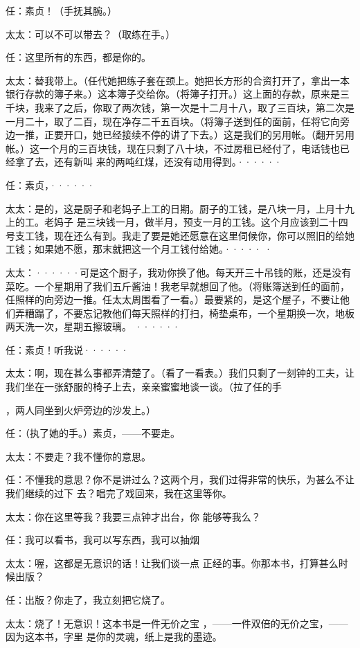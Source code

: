 \documentclass{article}
\begin{document}
\newpage

任：素贞！（手抚其腕。） 


太太：可以不可以带去？（取练在手。） 


任：这里所有的东西，都是你的。 

太太：替我带上。（任代她把练子套在颈上。她把长方形的合资打开了，拿出一本银行存款的簿子来。）这本簿子交给你。（将簿子打开。）这上面的存款，原来是三千块，我来了之后，你取了两次钱，第一次是十二月十八，取了三百块，第二次是一月二十，取了二百，现在净存二千五百块。（将簿子送到任的面前，任将它向旁边一推，正要开口，她已经接续不停的讲了下去。）这是我们的另用帐。（翻开另用帐。）这一个月的三百块钱，现在只剩了八十块，不过房租已经付了，电话钱也已经拿了去，还有新叫
来的两吨红煤，还没有动用得到。······ 


任：素贞，······ 

太太：是的，这是厨子和老妈子上工的日期。厨子的工钱，是八块一月，上月十九上的工。老妈子
\newpage
是三块钱一月，做半月，预支一月的工钱。这个月应该到二十四号支工钱，现在还么有到。我走了要是她还愿意在这里伺候你，你可以照旧的给她工钱；如果她不愿，那末就把这一个月工钱付给她。·····
· 


太太：······可是这个厨子，我劝你换了他。每天开三十吊钱的账，还是没有菜吃。一个星期用了我们五斤酱油！我老早就想回了他。（将账簿送到任的面前，任照样的向旁边一推。任太太周围看了一看。）最要紧的，是这个屋子，不要让他们弄糟蹋了，不要忘记教他们每天照样的打扫，椅垫桌布，一个星期换一次，地板两天洗一次，星期五擦玻璃。
······ 


任：素贞！听我说······ 

太太：啊，现在甚么事都弄清楚了。（看了一看表。）我们只剩了一刻钟的工夫，让我们坐在一张舒服的椅子上去，亲亲蜜蜜地谈一谈。（拉了任的手
\newpage

，两人同坐到火炉旁边的沙发上。） 


任：（执了她的手。）素贞，——不要走。 


太太：不要走？我不懂你的意思。 

任：不懂我的意思？你不是讲过么？这两个月，我们过得非常的快乐，为甚么不让我们继续的过下
去？唱完了戏回来，我在这里等你。 

太太：你在这里等我？我要三点钟才出台，你
能够等我么？ 

任：我可以看书，我可以写东西，我可以抽烟

太太：喔，这都是无意识的话！让我们谈一点
正经的事。你那本书，打算甚么时候出版？ 


任：出版？你走了，我立刻把它烧了。 

太太：烧了！无意识！这本书是一件无价之宝
\newpage
，——一件双倍的无价之宝，——因为这本书，字里
是你的灵魂，纸上是我的墨迹。 
\end{document}
